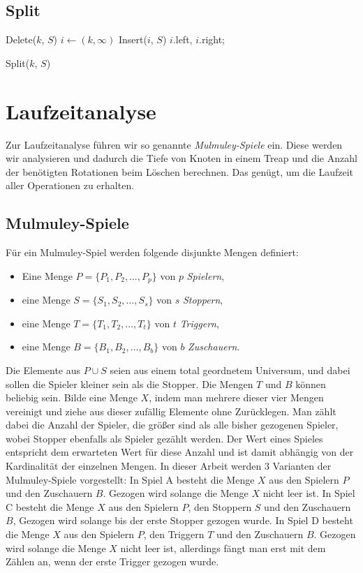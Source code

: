 \documentclass[a4paper]{scrreprt}
\theoremstyle{definition}
\begin{document}
\subsection{Split}
\label{sec:split}

\begin{algorithm}[H]
		Delete($k$, $S$) 
		$i \gets (k, \infty)$ \;
		Insert($i$, $S$) \;
		\Return $i$.left, $i$.right;
	\caption{Split($k$, $S$)}
\end{algorithm}

\section{Laufzeitanalyse}
\label{sec:runtime}
Zur Laufzeitanalyse führen wir so genannte \emph{Mulmuley-Spiele} ein.
Diese werden wir analysieren und dadurch die Tiefe von Knoten in einem Treap und die Anzahl der benötigten Rotationen beim Löschen berechnen.
Das genügt, um die Laufzeit aller Operationen zu erhalten.

\subsection{Mulmuley-Spiele}
\label{sec:mulmuley}
Für ein Mulmuley-Spiel werden folgende disjunkte Mengen definiert:
\begin{itemize}
    \item Eine Menge $P = \{P_1, P_2, \dots, P_p\}$ von $p$ \emph{Spielern},
    \item eine Menge $S = \{S_1, S_2, \dots, S_s\}$ von $s$ \emph{Stoppern},
    \item eine Menge $T = \{T_1, T_2, \dots, T_t\}$ von $t$ \emph{Triggern},
    \item eine Menge $B = \{B_1, B_2, \dots, B_b\}$ von $b$ \emph{Zuschauern}.
\end{itemize}
Die Elemente aus $P \cup S$ seien aus einem total geordnetem Universum, und dabei sollen die Spieler kleiner sein als die Stopper.
Die Mengen $T$ und $B$ können beliebig sein.
Bilde eine Menge $X$, indem man mehrere dieser vier Mengen vereinigt und ziehe aus dieser zufällig Elemente ohne Zurücklegen.
Man zählt dabei die Anzahl der Spieler, die größer sind als alle bisher gezogenen Spieler, wobei Stopper ebenfalls als Spieler gezählt werden.
Der Wert eines Spieles entspricht dem erwarteten Wert für diese Anzahl und ist damit abhängig von der Kardinalität der einzelnen Mengen.
In dieser Arbeit werden 3 Varianten der Mulmuley-Spiele vorgestellt:
In Spiel A besteht die Menge $X$ aus den Spielern $P$ und den Zuschauern $B$.
Gezogen wird solange die Menge $X$ nicht leer ist.
In Spiel C besteht die Menge $X$ aus den Spielern $P$, den Stoppern $S$ und den Zuschauern $B$,
Gezogen wird solange bis der erste Stopper gezogen wurde.
In Spiel D besteht die Menge $X$ aus den Spielern $P$, den Triggern $T$ und den Zuschauern $B$.
Gezogen wird solange die Menge $X$ nicht leer ist, allerdings fängt man erst mit dem Zählen an, wenn der erste Trigger gezogen wurde.
\end{document}
